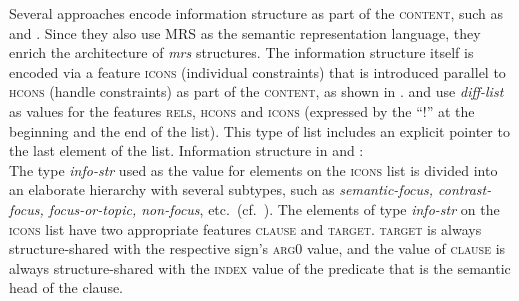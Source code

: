 \documentclass[output=paper,biblatex,babelshorthands,newtxmath,draftmode,colorlinks,citecolor=brown]{langscibook}
\begin{document}
Several approaches encode information structure as part of the \textsc{content},
such as  and . Since they also
use MRS as the semantic representation language, they enrich the
architecture of \textit{mrs} structures. The information structure
itself is encoded via a feature  \textsc{icons} (individual
constraints) that is introduced parallel to  \textsc{hcons} (handle
constraints) as part of the \textsc{content}, as shown in
. \citet{song2018} and \citet{song-bender:2012}
use  \textit{diff-list} as values for the features \textsc{rels, hcons}
and \textsc{icons} (expressed by the ``!'' at the beginning and the
end of the list). This type of list includes an explicit pointer
to the last element of the list.
\ea\label{fig:song-infostruc}
Information structure in  and :\\
\z
The type  \textit{info-str} used as the value for elements on the
\textsc{icons} list is divided into an elaborate hierarchy with
several subtypes, such as \textit{semantic-focus, contrast-focus,
  focus-or-topic, non-focus}, etc.\ (cf.~\citealt[114]{song2018}). The
elements of type \textit{info-str} on the \textsc{icons} list have two
appropriate features \textsc{clause} and \textsc{target}. \textsc{target} is
always structure-shared with the respective sign's \textsc{arg0} value, and
the value of \textsc{clause} is always structure-shared with the
\textsc{index} value of the predicate that is the semantic head of the
clause.
\end{document}
